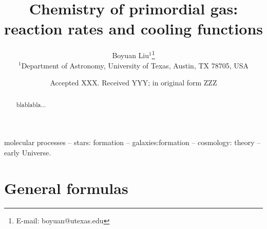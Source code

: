 \documentclass[fleqn,usenatbib]{mnras}
\title[Chemistry of primordial gas]{Chemistry of primordial gas: reaction rates and cooling functions}
\author[Boyuan Liu]{Boyuan Liu$^{1}$\thanks{E-mail: boyuan@utexas.edu}
\\
$^{1}$Department of Astronomy, University of Texas, Austin, TX 78705, USA}
\date{Accepted XXX. Received YYY; in original form ZZZ}
\begin{document}
\label{firstpage}
\pagerange{\pageref{firstpage}--\pageref{lastpage}}
\maketitle

\begin{abstract}
blablabla...
\end{abstract}

\begin{keywords}
molecular processes -- stars: formation -- galaxies:formation -- cosmology: theory -- early Universe.
\end{keywords}


 
\section{General formulas}



 

\label{lastpage}
\end{document}
